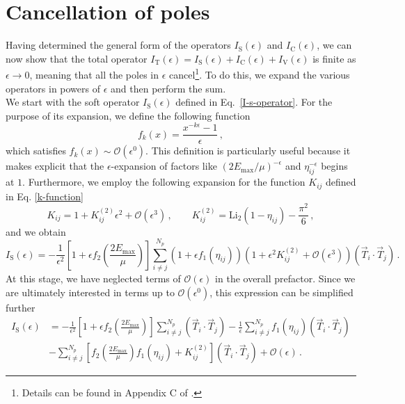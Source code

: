 \documentclass[a4paper, 12pt]{book}
\begin{document}
\section{Cancellation of poles}
\label{pole-cancellation-section}
Having determined the general form of the operators $I_{\mathrm{S}}(\epsilon)$ and $I_{\mathrm{C}}(\epsilon)$, we can now show that the total operator $I_{\mathrm{T}} (\epsilon)=I_{\mathrm{S}}(\epsilon)+I_{\mathrm{C}}(\epsilon)+I_{\mathrm{V}}(\epsilon)$ is finite as $\epsilon \to 0$, meaning that all the poles in $\epsilon$ cancel\footnote{Details can be found in Appendix C of \cite{Devoto:2025kin}.}. To do this, we expand the various operators in powers of $\epsilon$ and then perform the sum. \\

We start with the soft operator $I_{\mathrm{S}}(\epsilon)$ defined in Eq.~\ref{I-s-operator}. For the purpose of its expansion, we define the following function
\begin{equation}
  f_k(x) = \frac{x^{-k\epsilon}-1}{\epsilon} \, ,
\end{equation}
which satisfies $f_k(x) \sim \mathcal{O}(\epsilon^0) $. This definition is particularly useful because it makes explicit that the $\epsilon$-expansion of factors like $(2E_{\mathrm{max}}/\mu)^{-\epsilon}$ and $\eta_{ij}^{-\epsilon}$ begins at $1$. Furthermore, we employ the following expansion for the function $K_{ij}$ defined in Eq. \ref{k-function}
\begin{equation}
  K_{ij} = 1+ K_{ij}^{(2)} \epsilon^2 + \mathcal{O}(\epsilon^3) \, , \qquad  K_{ij}^{(2)} = \mathrm{Li}_2(1-\eta_{ij}) - \frac{\pi^2}{6} \, , 
\end{equation}
and we obtain 
\begin{equation}
  I_{\mathrm{S}}(\epsilon) = - \frac{1}{\epsilon^2} \left[1+\epsilon f_2 \left(\frac{2 E_{\mathrm{max}}}{\mu}\right)\right] \sum_{i \neq j}^{N_p} (1+\epsilon f_1(\eta_{ij}))(1+ \epsilon^2 K_{ij}^{(2)} + \mathcal{O}(\epsilon^3)) \left( \vec{T}_i \cdot \vec{T}_j\right) \,.
\end{equation}
At this stage, we have neglected terms of $\mathcal{O}(\epsilon)$ in the overall prefactor. Since we are ultimately interested in terms up to $\mathcal{O}(\epsilon^0)$, this expression can be simplified further
\begin{equation}
  \begin{aligned}
   I_{\mathrm{S}}(\epsilon) & = - \frac{1}{\epsilon^2} \left[1+\epsilon f_2 \left(\frac{2 E_{\mathrm{max}} }{\mu}\right)\right] \sum_{i \neq j}^{N_p}\left( \vec{T}_i \cdot \vec{T}_j\right) - \frac{1}{\epsilon} \sum_{i \neq j}^{N_p} f_1(\eta_{ij}) \left( \vec{T}_i \cdot \vec{T}_j\right)  \\
  & - \sum_{i \neq j}^{N_p} \left[f_2 \left(\frac{2 E_{\mathrm{max}} }{\mu}\right) f_1(\eta_{ij}) + K_{ij}^{(2)} \right] \left( \vec{T}_i \cdot \vec{T}_j\right) + \mathcal{O}(\epsilon) \, . 
  \end{aligned}
\end{equation}
\end{document}
